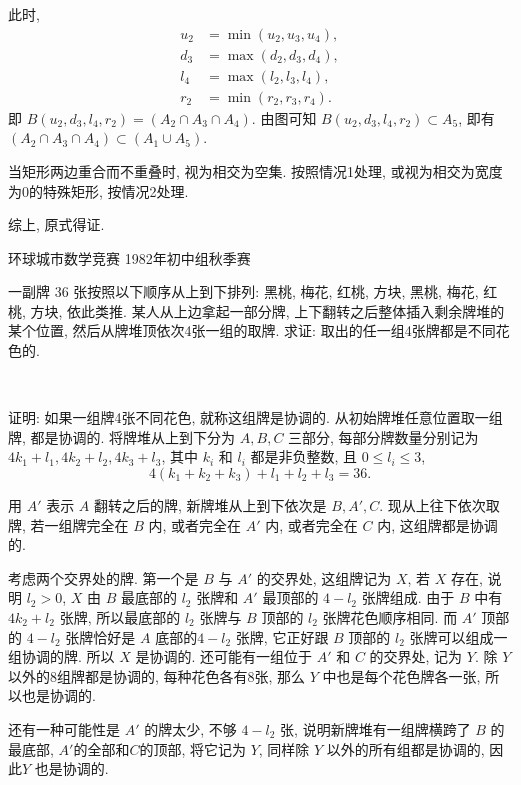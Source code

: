 \noindent 此时, 
\begin{align*}
u_2 &= \min(u_2, u_3, u_4), \\
d_3 &= \max(d_2, d_3, d_4), \\
l_4 &= \max(l_2, l_3, l_4), \\
r_2 &= \min(r_2, r_3, r_4).
\end{align*}
即 $B(u_2, d_3, l_4, r_2) = (A_2\cap A_3\cap A_4)$. 由图可知 $B(u_2, d_3, l_4, r_2)\subset A_5$, 即有 $(A_2\cap A_3\cap A_4) \subset (A_1\cup A_5)$.

当矩形两边重合而不重叠时, 视为相交为空集. 按照情况1处理, 或视为相交为宽度为0的特殊矩形, 按情况2处理.

综上, 原式得证.


\newpage

\noindent 环球城市数学竞赛 1982年初中组秋季赛

一副牌 36 张按照以下顺序从上到下排列: 黑桃, 梅花, 红桃, 方块, 黑桃, 梅花, 红桃, 方块, 依此类推. 某人从上边拿起一部分牌, 上下翻转之后整体插入剩余牌堆的某个位置, 然后从牌堆顶依次4张一组的取牌. 求证: 取出的任一组4张牌都是不同花色的.

~

证明: 如果一组牌4张不同花色, 就称这组牌是协调的. 从初始牌堆任意位置取一组牌, 都是协调的. 将牌堆从上到下分为 $A,B,C$ 三部分, 每部分牌数量分别记为 $4k_1+l_1, 4k_2+l_2, 4k_3+l_3$, 其中 $k_i$ 和 $l_i$ 都是非负整数, 且 $0\le l_i \le 3$, 
\[4(k_1+k_2+k_3) + l_1+l_2+l_3 = 36 .\]

用 $A'$ 表示 $A$ 翻转之后的牌, 新牌堆从上到下依次是 $B, A', C$. 现从上往下依次取牌, 若一组牌完全在 $B$ 内, 或者完全在 $A'$ 内, 或者完全在 $C$ 内, 这组牌都是协调的. 

考虑两个交界处的牌. 第一个是 $B$ 与 $A'$ 的交界处, 这组牌记为 $X$, 若 $X$ 存在, 说明 $l_2 > 0$, $X$ 由 $B$ 最底部的 $l_2$ 张牌和 $A'$ 最顶部的 $4-l_2$ 张牌组成. 由于 $B$ 中有 $4k_2+l_2$ 张牌, 所以最底部的 $l_2$ 张牌与 $B$ 顶部的 $l_2$ 张牌花色顺序相同. 而 $A'$ 顶部的 $4-l_2$ 张牌恰好是 $A$ 底部的$4-l_2$ 张牌, 它正好跟 $B$ 顶部的 $l_2$ 张牌可以组成一组协调的牌. 所以 $X$ 是协调的. 还可能有一组位于 $A'$ 和 $C$ 的交界处, 记为 $Y$. 除 $Y$ 以外的8组牌都是协调的, 每种花色各有8张, 那么 $Y$ 中也是每个花色牌各一张, 所以也是协调的.

还有一种可能性是 $A'$ 的牌太少, 不够 $4-l_2$ 张, 说明新牌堆有一组牌横跨了 $B$ 的最底部, $A'$的全部和$C$的顶部, 将它记为 $Y$, 同样除 $Y$ 以外的所有组都是协调的, 因此$Y$ 也是协调的.




